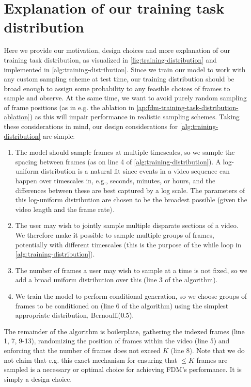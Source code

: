 \section{Explanation of our training task distribution} \label{app:training-task-dist-exp}
Here we provide our motivation, design choices and more explanation of our training task distribution, as visualized in \cref{fig:training-distribution} and implemented in \cref{alg:training-distribution}. Since we train our model to work with any custom sampling scheme at test time, our training distribution should be broad enough to assign some probability to any feasible choices of frames to sample and observe. At the same time, we want to avoid purely random sampling of frame positions (as in e.g. the ablation in \cref{ap:fdm-training-task-distribution-ablation}) as this will impair performance in realistic sampling schemes. Taking these considerations in mind, our design considerations for \cref{alg:training-distribution} are simple:
\begin{enumerate}
    \item The model should sample frames at multiple timescales, so we sample the spacing between frames (as on line 4 of \cref{alg:training-distribution}). A log-uniform distribution is a natural fit since events in a video sequence can happen over timescales in, e.g., seconds, minutes, or hours, and the differences between these are best captured by a log scale. The parameters of this log-uniform distribution are chosen to be the broadest possible (given the video length and the frame rate).
    \item The user may wish to jointly sample multiple disparate sections of a video. We therefore make it possible to sample multiple groups of frames, potentially with different timescales (this is the purpose of the while loop in \cref{alg:training-distribution}).
    \item The number of frames a user may wish to sample at a time is not fixed, so we add a broad uniform distribution over this (line 3 of the algorithm).
    \item We train the model to perform conditional generation, so we choose groups of frames to be conditioned on (line 6 of the algorithm) using the simplest appropriate distribution, Bernoulli(0.5).
\end{enumerate}
The remainder of the algorithm is boilerplate, gathering the indexed frames (line 1, 7, 9-13), randomizing the position of frames within the video (line 5) and enforcing that the number of frames does not exceed $K$ (line 8). Note that we do not claim that e.g. this exact mechanism for ensuring that $\leq K$ frames are sampled is a necessary or optimal choice for achieving FDM’s performance. It is simply a design choice.

